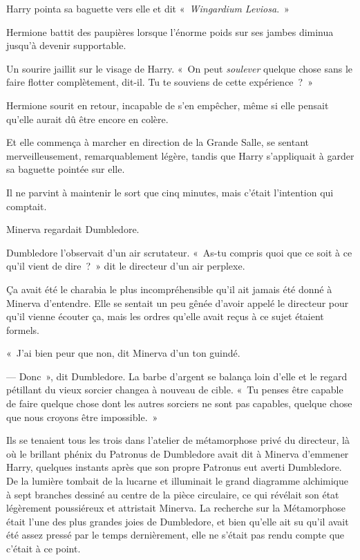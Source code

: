 Harry pointa sa baguette vers elle et dit «~\emph{Wingardium Leviosa}.~»

Hermione battit des paupières lorsque l'énorme poids sur ses jambes diminua jusqu'à devenir supportable.

Un sourire jaillit sur le visage de Harry. «~On peut \emph{soulever} quelque chose sans le faire flotter complètement, dit-il. Tu te souviens de cette expérience~?~»

Hermione sourit en retour, incapable de s'en empêcher, même si elle pensait qu'elle aurait dû être encore en colère.

Et elle commença à marcher en direction de la Grande Salle, se sentant merveilleusement, remarquablement légère, tandis que Harry s'appliquait à garder sa baguette pointée sur elle.

Il ne parvint à maintenir le sort que cinq minutes, mais c'était l'intention qui comptait.

\later

Minerva regardait Dumbledore.

Dumbledore l'observait d'un air scrutateur. «~As-tu compris quoi que ce soit à ce qu'il vient de dire~?~» dit le directeur d'un air perplexe.

Ça avait été le charabia le plus incompréhensible qu'il ait jamais été donné à Minerva d'entendre. Elle se sentait un peu gênée d'avoir appelé le directeur pour qu'il vienne écouter ça, mais les ordres qu'elle avait reçus à ce sujet étaient formels.

«~J'ai bien peur que non, dit Minerva d'un ton guindé.

--- Donc~», dit Dumbledore. La barbe d'argent se balança loin d'elle et le regard pétillant du vieux sorcier changea à nouveau de cible. «~Tu penses être capable de faire quelque chose dont les autres sorciers ne sont pas capables, quelque chose que nous croyons être impossible.~»

Ils se tenaient tous les trois dans l'atelier de métamorphose privé du directeur, là où le brillant phénix du Patronus de Dumbledore avait dit à Minerva d'emmener Harry, quelques instants après que son propre Patronus eut averti Dumbledore. De la lumière tombait de la lucarne et illuminait le grand diagramme alchimique à sept branches dessiné au centre de la pièce circulaire, ce qui révélait son état légèrement poussiéreux et attristait Minerva. La recherche sur la Métamorphose était l'une des plus grandes joies de Dumbledore, et bien qu'elle ait su qu'il avait été assez pressé par le temps dernièrement, elle ne s'était pas rendu compte que c'était à ce point.

